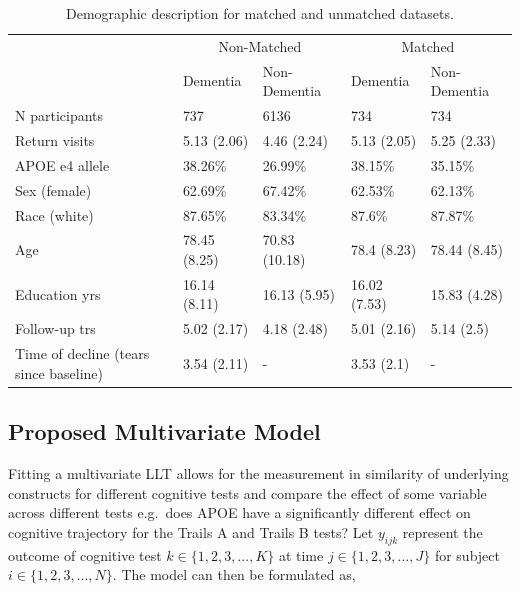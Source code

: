 \documentclass[
]{article}
\begin{document}
\begin{table}

\caption{\label{tab:unnamed-chunk-12}Demographic description for matched and unmatched datasets.}
\centering
\begin{tabular}[t]{lllll}
\toprule
\multicolumn{1}{c}{ } & \multicolumn{2}{c}{Non-Matched} & \multicolumn{2}{c}{Matched} \\
\cmidrule(l{3pt}r{3pt}){2-3} \cmidrule(l{3pt}r{3pt}){4-5}
  & Dementia & Non-Dementia & Dementia & Non-Dementia\\
\midrule
N participants & 737 & 6136 & 734 & 734\\
Return visits & 5.13 (2.06) & 4.46 (2.24) & 5.13 (2.05) & 5.25 (2.33)\\
APOE e4 allele & 38.26\% & 26.99\% & 38.15\% & 35.15\%\\
Sex (female) & 62.69\% & 67.42\% & 62.53\% & 62.13\%\\
Race (white) & 87.65\% & 83.34\% & 87.6\% & 87.87\%\\
\addlinespace
Age & 78.45 (8.25) & 70.83 (10.18) & 78.4 (8.23) & 78.44 (8.45)\\
Education yrs & 16.14 (8.11) & 16.13 (5.95) & 16.02 (7.53) & 15.83 (4.28)\\
Follow-up trs & 5.02 (2.17) & 4.18 (2.48) & 5.01 (2.16) & 5.14 (2.5)\\
Time of decline
(tears since baseline) & 3.54 (2.11) & - & 3.53 (2.1) & -\\
\bottomrule
\end{tabular}
\end{table}

\hypertarget{proposed-multivariate-model}{%
\subsection{Proposed Multivariate Model}\label{proposed-multivariate-model}}

Fitting a multivariate LLT allows for the measurement in similarity of underlying constructs for different cognitive tests and compare the effect of some variable across different tests e.g.~does APOE have a significantly different effect on cognitive trajectory for the Trails A and Trails B tests? Let \(y_{ijk}\) represent the outcome of cognitive test \(k\in \{1, 2, 3, ..., K\}\) at time \(j\in \{1, 2, 3, ..., J\}\) for subject \(i \in \{1, 2, 3, ..., N\}\). The model can then be formulated as,
\end{document}
